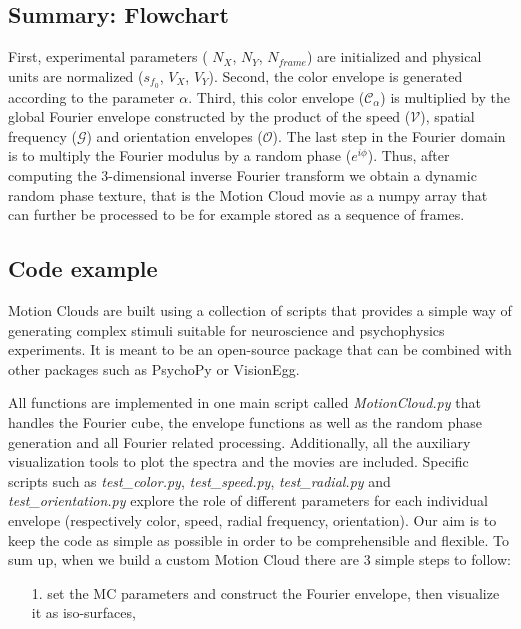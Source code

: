 \documentclass[a4paper,11pt]{article}%
\begin{document}
\subsection{Summary: Flowchart}\label{subsection:flowchart}
 First, experimental parameters ( $N_{X}$, $N_{Y}$, $N_{frame}$) are initialized and physical units are normalized ($s_{f_0}$, $V_X$, $V_Y$).  Second, the color envelope is generated according to the parameter $\alpha$. Third, this color envelope ($\mathcal{C_{\alpha}}$) is multiplied by the global Fourier envelope constructed by the product of the speed ($\mathcal{V}$), spatial frequency ($\mathcal{G}$) and orientation envelopes ($\mathcal{O}$). The last step in the Fourier domain is to multiply the Fourier modulus by  a random phase ($e^{i\phi}$). Thus, after computing the 3-dimensional inverse Fourier transform we obtain a dynamic random phase texture, that is the Motion Cloud movie as a numpy array that can further be processed to be for example stored as a sequence of frames.


\subsection{Code example}
\label{subsection:implementation}

Motion Clouds are built using a collection of scripts that provides a simple way of generating complex stimuli suitable for neuroscience and psychophysics experiments. It is meant to be an open-source package  that can be combined with other packages such as PsychoPy or VisionEgg.%

All functions are implemented in one main script called \textit{MotionCloud.py} that handles the Fourier cube, the envelope functions as well as the random phase generation and all Fourier related processing. Additionally, all the auxiliary visualization tools to plot the spectra and the movies are included. Specific scripts such as \textit{test\_color.py}, \textit{test\_speed.py}, \textit{test\_radial.py} and \textit{test\_orientation.py} explore the role of different parameters for each individual envelope (respectively color, speed, radial frequency, orientation). Our aim is to keep the code as simple as possible in order to be comprehensible and flexible. To sum up, when we build a custom  Motion Cloud there are 3 simple steps to follow:

\begin{enumerate}
\item[1.] set the MC parameters and construct the Fourier envelope, then visualize it as iso-surfaces,
\end{enumerate}
\end{document}
